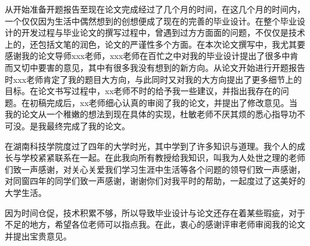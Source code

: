\documentclass{husethesis}
\begin{document}

从开始准备开题报告至现在论文完成经过了几个月的时间，在这几个月的时间内，一个仅仅因为生活中偶然想到的创想便成了现在的完善的毕业设计。在整个毕业设计的开发过程与毕业论文的撰写过程中，曾遇到过方方面面的问题，不仅仅是技术上的，还包括文笔的润色，论文的严谨性多个方面。在本次论文撰写中，我尤其要感谢我的论文导师xxx老师，xxx老师在百忙之中对我的毕业设计提出了很多中肯而又切中要害的意见，其中有很多我没有想到的新方向。从论文开始进行开题报告时xxx老师肯定了我的题目大方向，与此同时又对我的大方向提出了更多细节上的目标。在论文书写过程中，xx老师不时的给予我一些建议，并指出我存在的问题。在初稿完成后，xx老师细心认真的审阅了我的论文，并提出了修改意见。当我的论文从一个稚嫩的想法到现在具体的实现，杜敏老师不厌其烦的悉心指导功不可没。是我最终完成了我的论文。

在湖南科技学院度过了四年的大学时光，其中学到了许多知识与道理。我个人的成长与学校紧紧联系在一起。在此我向所有教授给我知识，叫我为人处世之理的老师们致一声感谢，对关心关爱我们学习生涯中生活等各个问题的领导们致一声感谢，对同窗四年的同学们致一声感谢，谢谢你们对我平时的帮助，一起度过了这美好的大学生活。

因为时间仓促，技术积累不够，所以导致毕业设计与论文还存在着某些瑕疵，对于不足的地方，希望各位老师可以指点我。在此，衷心的感谢评审老师审阅我的论文并提出宝贵意见。
\end{document}
